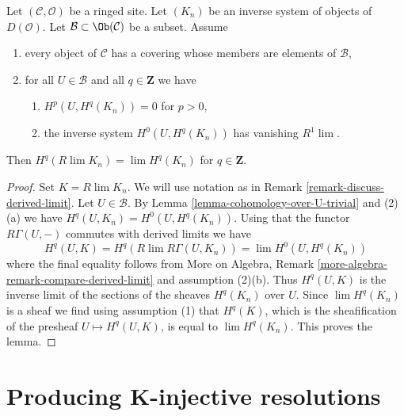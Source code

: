 \begin{lemma}
\label{lemma-derived-limit-suitable-system}
Let $(\mathcal{C}, \mathcal{O})$ be a ringed site. Let $(K_n)$
be an inverse system of objects of $D(\mathcal{O})$.
Let $\mathcal{B} \subset \Ob(\mathcal{C})$ be a subset. Assume
\begin{enumerate}
\item every object of $\mathcal{C}$ has a covering whose members are
elements of $\mathcal{B}$,
\item for all $U \in \mathcal{B}$ and all $q \in \mathbf{Z}$ we have
\begin{enumerate}
\item $H^p(U, H^q(K_n)) = 0$ for $p > 0$,
\item the inverse system $H^0(U, H^q(K_n))$ has vanishing $R^1\lim$.
\end{enumerate}
\end{enumerate}
Then $H^q(R\lim K_n) = \lim H^q(K_n)$ for $q \in \mathbf{Z}$.
\end{lemma}

\begin{proof}
Set $K = R\lim K_n$. We will use notation as in
Remark \ref{remark-discuss-derived-limit}. Let $U \in \mathcal{B}$.
By Lemma \ref{lemma-cohomology-over-U-trivial} and (2)(a)
we have $H^q(U, K_n) = H^0(U, H^q(K_n))$.
Using that the functor $R\Gamma(U, -)$ commutes with
derived limits we have
$$
H^q(U, K) = H^q(R\lim R\Gamma(U, K_n)) = \lim H^0(U, H^q(K_n))
$$
where the final equality follows from
More on Algebra, Remark \ref{more-algebra-remark-compare-derived-limit}
and assumption (2)(b). Thus $H^q(U, K)$ is the inverse limit
of the sections of the sheaves $H^q(K_n)$ over $U$. Since
$\lim H^q(K_n)$ is a sheaf we find using assumption (1) that $H^q(K)$,
which is the sheafification of the presheaf $U \mapsto H^q(U, K)$,
is equal to $\lim H^q(K_n)$. This proves the lemma.
\end{proof}







\section{Producing K-injective resolutions}
\label{section-K-injective}

